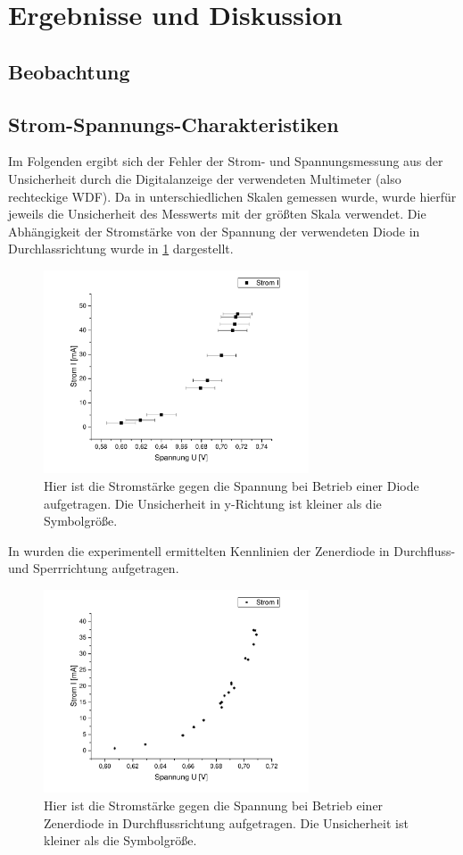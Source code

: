\documentclass[
	a4paper,
	12pt,
	pagesize,
	ngerman
]{scrartcl}
\begin{document}
	\section{Ergebnisse und Diskussion}

	\subsection{Beobachtung}
	\subsection{Strom-Spannungs-Charakteristiken}
	Im Folgenden ergibt sich der Fehler der Strom- und Spannungsmessung aus der Unsicherheit durch die Digitalanzeige der verwendeten Multimeter (also rechteckige WDF).
	Da in unterschiedlichen Skalen gemessen wurde, wurde hierfür jeweils die Unsicherheit des Messwerts mit der größten Skala verwendet.
	Die Abhängigkeit der Stromstärke von der Spannung der verwendeten Diode in Durchlassrichtung wurde in \cref{Diode} dargestellt.
	\begin{figure}[H]
		\includegraphics[width=0.7\textwidth]{Diode}
		\centering
		\caption{Hier ist die Stromstärke  gegen die Spannung bei Betrieb einer Diode aufgetragen. Die Unsicherheit in y-Richtung ist kleiner als die Symbolgröße.}
		\label{Diode}
		\centering
	\end{figure} 
	In  wurden die experimentell ermittelten Kennlinien der Zenerdiode in Durchfluss- und Sperrrichtung aufgetragen.
	\begin{figure}[H]
		\includegraphics[width=0.7\textwidth]{Zener_Durch}
		\centering
		\caption{Hier ist die Stromstärke  gegen die Spannung bei Betrieb einer Zenerdiode in Durchflussrichtung aufgetragen. Die Unsicherheit ist kleiner als die Symbolgröße.}
		\label{Zener_Durch}
		\centering
	\end{figure}
\end{document}
